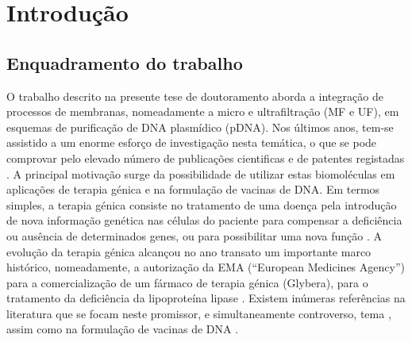 \chapter{Introdução}
\label{chap:intro}

\section{Enquadramento do trabalho}
O trabalho descrito na presente tese de doutoramento aborda a integração de processos de membranas, nomeadamente a micro e ultrafiltração (MF e UF), em esquemas de purificação de DNA plasmídico (pDNA). Nos últimos anos, tem-se assistido a um enorme esforço de investigação nesta temática, o que se pode comprovar pelo elevado número de publicações cientificas e de patentes registadas \cite{carnes}. A principal motivação surge da possibilidade de utilizar estas biomoléculas em aplicações de terapia génica e na formulação de vacinas de DNA. Em termos simples, a terapia génica consiste no tratamento de uma doença pela introdução de nova informação genética nas células do paciente para compensar a deficiência ou ausência de determinados genes, ou para possibilitar uma nova função \cite{emery}. A evolução da terapia génica alcançou no ano transato um importante marco histórico, nomeadamente, a autorização da  EMA (``European Medicines Agency'') para a comercialização de um fármaco de terapia génica (Glybera), para o tratamento da deficiência da lipoproteína lipase \cite{wirth}. Existem inúmeras referências na literatura que se focam neste promissor, e simultaneamente controverso, tema \cite{mountain,emery,wirth,schleef}, assim como na formulação de vacinas de DNA \cite{liu03,liu11,kutzler}.


